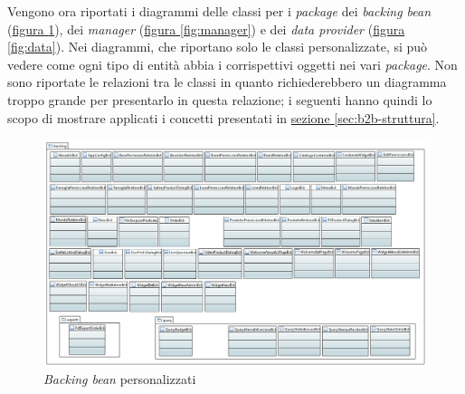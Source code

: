 Vengono ora riportati i diagrammi delle classi per i \textit{package} dei \textit{backing bean} (\hyperref[fig:bck]{figura \ref{fig:bck}}), dei \textit{manager} (\hyperref[fig:manager]{figura \ref{fig:manager}}) e dei \textit{data provider} (\hyperref[fig:data]{figura \ref{fig:data}}). Nei diagrammi, che riportano solo le classi personalizzate, si può vedere come ogni tipo di entità abbia i corrispettivi oggetti nei vari \textit{package}. Non sono riportate le relazioni tra le classi in quanto richiederebbero un diagramma troppo grande per presentarlo in questa relazione; i seguenti hanno quindi lo scopo di mostrare applicati i concetti presentati in \hyperref[sec:b2b-struttura]{sezione \ref{sec:b2b-struttura}}.
\begin{figure}[H]
	\centering
	\includegraphics[height=\linewidth,angle=90]{Immagini/p2/bck.png}
	\caption{\textit{Backing bean} personalizzati}
	\label{fig:bck}
\end{figure}
